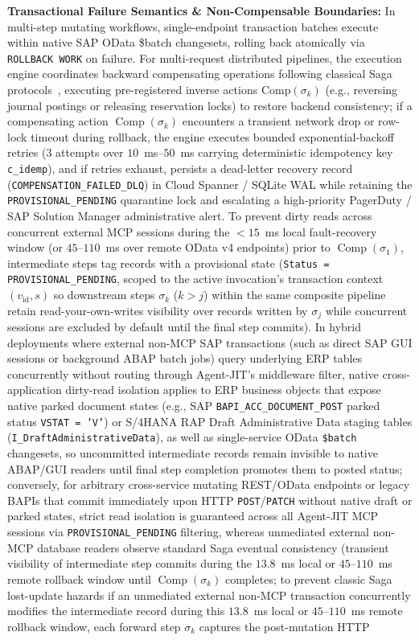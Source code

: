 \documentclass[conference,10pt]{IEEEtran}
\begin{document}
\textbf{Transactional Failure Semantics \& Non-Compensable Boundaries:} In multi-step mutating workflows, single-endpoint transaction batches execute within native SAP OData \$batch changesets, rolling back atomically via \texttt{ROLLBACK WORK} on failure. For multi-request distributed pipelines, the execution engine coordinates backward compensating operations following classical Saga protocols~\cite{garciamolina1987sagas, mohan1992aries}, executing pre-registered inverse actions $\text{Comp}(\sigma_k)$ (e.g., reversing journal postings or releasing reservation locks) to restore backend consistency; if a compensating action $\operatorname{Comp}(\sigma_k)$ encounters a transient network drop or row-lock timeout during rollback, the engine executes bounded exponential-backoff retries ($3$ attempts over $10$~ms--$50$~ms carrying deterministic idempotency key \texttt{c\_idemp}), and if retries exhaust, persists a dead-letter recovery record (\texttt{COMPENSATION\_FAILED\_DLQ}) in Cloud Spanner / SQLite WAL while retaining the \texttt{PROVISIONAL\_PENDING} quarantine lock and escalating a high-priority PagerDuty / SAP Solution Manager administrative alert. To prevent dirty reads across concurrent external MCP sessions during the $<15$~ms local fault-recovery window (or $45$--$110$~ms over remote OData v4 endpoints) prior to $\operatorname{Comp}(\sigma_1)$, intermediate steps tag records with a provisional state (\texttt{Status = PROVISIONAL\_PENDING}, scoped to the active invocation's transaction context $(v_{\text{id}}, s)$ so downstream steps $\sigma_k$ ($k > j$) within the same composite pipeline retain read-your-own-writes visibility over records written by $\sigma_j$ while concurrent sessions are excluded by default until the final step commits). In hybrid deployments where external non-MCP SAP transactions (such as direct SAP GUI sessions or background ABAP batch jobs) query underlying ERP tables concurrently without routing through Agent-JIT's middleware filter, native cross-application dirty-read isolation applies to ERP business objects that expose native parked document states (e.g., SAP \texttt{BAPI\_ACC\_DOCUMENT\_POST} parked status \texttt{VSTAT = 'V'}) or S/4HANA RAP Draft Administrative Data staging tables (\texttt{I\_DraftAdministrativeData}), as well as single-service OData \texttt{\$batch} changesets, so uncommitted intermediate records remain invisible to native ABAP/GUI readers until final step completion promotes them to posted status; conversely, for arbitrary cross-service mutating REST/OData endpoints or legacy BAPIs that commit immediately upon HTTP \texttt{POST}/\texttt{PATCH} without native draft or parked states, strict read isolation is guaranteed across all Agent-JIT MCP sessions via \texttt{PROVISIONAL\_PENDING} filtering, whereas unmediated external non-MCP database readers observe standard Saga eventual consistency (transient visibility of intermediate step commits during the $13.8$~ms local or $45$--$110$~ms remote rollback window until $\operatorname{Comp}(\sigma_k)$ completes; to prevent classic Saga lost-update hazards if an unmediated external non-MCP transaction concurrently modifies the intermediate record during this $13.8$~ms local or $45$--$110$~ms remote rollback window, each forward step $\sigma_k$ captures the post-mutation HTTP 
\end{document}
